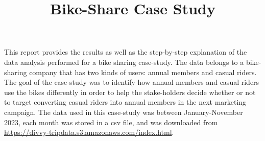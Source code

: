 \documentclass[12pt]{article}
\begin{document}
\title{Bike-Share Case Study}
\date{}
\maketitle

This report provides the results as well as the step-by-step explanation of the data analysis performed for a bike sharing case-study. The data belongs to a bike-sharing company that has two kinds of users: annual members and casual riders. The goal of the case-study was to identify how annual members and casual riders use the bikes differently in order to help the stake-holders decide whether or not to target converting casual riders into annual members in the next marketing campaign. The data used in this case-study was between January-November 2023, each month was stored in a csv file, and was downloaded from \url{https://divvy-tripdata.s3.amazonaws.com/index.html}. 
\end{document}
